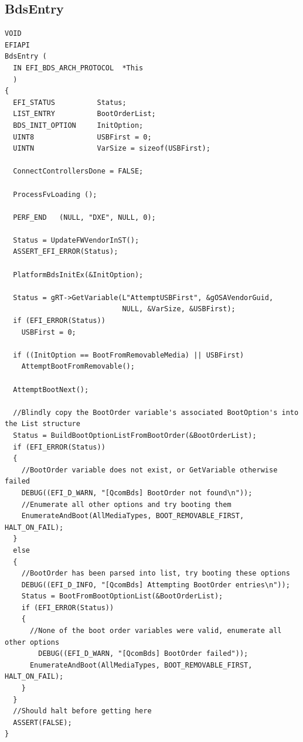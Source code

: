 \subsection{BdsEntry\label{BdsEntry}}
\begin{lstlisting}
VOID
EFIAPI
BdsEntry (
  IN EFI_BDS_ARCH_PROTOCOL  *This
  )
{
  EFI_STATUS          Status;
  LIST_ENTRY          BootOrderList;
  BDS_INIT_OPTION     InitOption;
  UINT8               USBFirst = 0;
  UINTN               VarSize = sizeof(USBFirst);
  
  ConnectControllersDone = FALSE;

  ProcessFvLoading ();

  PERF_END   (NULL, "DXE", NULL, 0);

  Status = UpdateFWVendorInST();
  ASSERT_EFI_ERROR(Status);

  PlatformBdsInitEx(&InitOption);

  Status = gRT->GetVariable(L"AttemptUSBFirst", &gOSAVendorGuid,
                            NULL, &VarSize, &USBFirst);
  if (EFI_ERROR(Status))
    USBFirst = 0;
	
  if ((InitOption == BootFromRemovableMedia) || USBFirst)
    AttemptBootFromRemovable();

  AttemptBootNext();

  //Blindly copy the BootOrder variable's associated BootOption's into the List structure
  Status = BuildBootOptionListFromBootOrder(&BootOrderList);
  if (EFI_ERROR(Status))
  {
    //BootOrder variable does not exist, or GetVariable otherwise failed
    DEBUG((EFI_D_WARN, "[QcomBds] BootOrder not found\n"));
    //Enumerate all other options and try booting them
    EnumerateAndBoot(AllMediaTypes, BOOT_REMOVABLE_FIRST, HALT_ON_FAIL);
  }
  else 
  {
    //BootOrder has been parsed into list, try booting these options
    DEBUG((EFI_D_INFO, "[QcomBds] Attempting BootOrder entries\n"));
    Status = BootFromBootOptionList(&BootOrderList);
    if (EFI_ERROR(Status)) 
    { 
      //None of the boot order variables were valid, enumerate all other options
	    DEBUG((EFI_D_WARN, "[QcomBds] BootOrder failed"));
      EnumerateAndBoot(AllMediaTypes, BOOT_REMOVABLE_FIRST, HALT_ON_FAIL);
    }
  }
  //Should halt before getting here
  ASSERT(FALSE);
}
\end{lstlisting}

